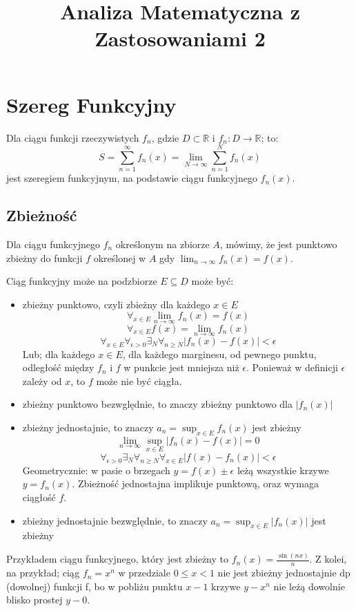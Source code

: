 \documentclass{../notatki}
\title{Analiza Matematyczna z Zastosowaniami 2}
\begin{document}
\section{Szereg Funkcyjny}

Dla ciągu funkcji rzeczywistych $f_n$, gdzie $D \subset \mathbb{R}$ i
$f_n: D \to \mathbb{R}$; to:
$$
S = \sum_{n=1}^{\infty} f_n(x) = \lim_{N \to \infty} \sum_{n=1}^{N} f_n(x)
$$
jest szeregiem funkcyjnym, na podstawie ciągu funkcyjnego $f_n(x)$.

\subsection{Zbieżność}

Dla ciągu funkcyjnego $f_n$ określonym na zbiorze $A$, mówimy, że jest
punktowo zbieżny do funkcji $f$ określonej w $A$ gdy $\lim_{n \to
\infty} f_n(x) = f(x)$.

Ciąg funkcyjny może na podzbiorze $E \subseteq D$ może być:
\begin{itemize}
  \item zbieżny punktowo, czyli zbieżny dla każdego $x \in E$
    $$
    \forall_{x \in E} \lim_{n \to \infty} f_n(x) = f(x)
    $$
    $$
    \forall_{x \in E} f(x) = \lim_{n \to \infty} f_n(x)
    $$
    $$
    \forall_{x \in E} \forall_{\epsilon > 0} \exists_{N} \forall_{n
    \ge N} |f_n(x) - f(x)| < \epsilon
    $$
    Lub; dla każdego $x \in E$, dla każdego marginesu, od pewnego
    punktu, odległość między $f_n$ i $f$ w punkcie jest mniejsza niż $\epsilon$.
    Ponieważ w definicji $\epsilon$ zależy od $x$, to $f$ może nie być ciągła.
  \item zbieżny punktowo bezwględnie, to znaczy zbieżny punktowo dla $|f_n(x)|$
  \item zbieżny jednostajnie, to znaczy $a_n = \sup_{x \in E} f_n(x)$
    jest zbieżny
    $$
    \lim_{n \to \infty} \sup_{x \in E} |f_n(x) - f(x)| = 0
    $$
    $$
    \forall_{\epsilon > 0} \exists_{N} \forall_{n \ge N} \forall_{x
    \in E} |f(x) - f_n(x)| < \epsilon
    $$
    Geometrycznie: w pasie o brzegach $y = f(x) \pm \epsilon$ leżą wszystkie
    krzywe $y = f_n(x)$. Zbieżność jednostajna implikuje punktową, oraz
    wymaga ciągłość $f$.
  \item zbieżny jednostajnie bezwględnie, to znaczy $a_n = \sup_{x
    \in E} |f_n(x)|$ jest zbieżny
\end{itemize}

Przykładem ciągu funkcyjnego, który jest zbieżny to $f_n(x) =
\frac{\sin(nx)}{n}$. Z kolei, na przykład; ciąg $f_n = x^n$ w przedziale
$0 \le x < 1$ nie jest zbieżny jednostajnie dp (dowolnej) funkcji f, bo w
pobliżu punktu $x - 1$ krzywe $y - x^n$ nie leżą dowolnie blisko prostej
$y - 0$.
\end{document}

